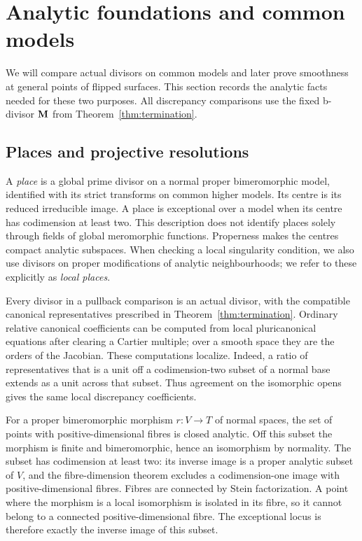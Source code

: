 \section{Analytic foundations and common models}\label{sec:foundations}

We will compare actual divisors on common models and later prove
smoothness at general points of flipped surfaces. This section
records the analytic facts needed for these two purposes. All
discrepancy comparisons use the fixed b-divisor $\mathbf M$ from
Theorem~\ref{thm:termination}.

\subsection{Places and projective resolutions}\label{subsec:places}

A \emph{place} is a global prime divisor on a normal proper
bimeromorphic model, identified with its strict transforms on common
higher models. Its centre is its reduced irreducible image. A place
is exceptional over a model when its centre has codimension at least
two. This description does not identify places solely through fields
of global meromorphic functions. Properness makes the centres compact
analytic subspaces. When checking a local singularity condition, we
also use divisors on proper modifications of analytic neighbourhoods;
we refer to these explicitly as \emph{local places}.

Every divisor in a pullback comparison is an actual divisor, with
the compatible canonical representatives prescribed in
Theorem~\ref{thm:termination}. Ordinary relative canonical
coefficients can be computed from local pluricanonical equations
after clearing a Cartier multiple; over a smooth space they are
the orders of the Jacobian. These computations localize. Indeed,
a ratio of representatives that is a unit off a codimension-two
subset of a normal base extends as a unit across that subset.
Thus agreement on the isomorphic opens gives the same local
discrepancy coefficients.

For a proper bimeromorphic morphism $r:V\to T$ of normal spaces,
the set of points with positive-dimensional fibres is closed
analytic. Off this subset the morphism is finite and
bimeromorphic, hence an isomorphism by normality. The subset has
codimension at least two: its inverse image is a proper analytic
subset of $V$, and the fibre-dimension theorem excludes a
codimension-one image with positive-dimensional fibres. Fibres
are connected by Stein factorization. A point where the morphism
is a local isomorphism is isolated in its fibre, so it cannot
belong to a connected positive-dimensional fibre. The exceptional
locus is therefore exactly the inverse image of this subset.

